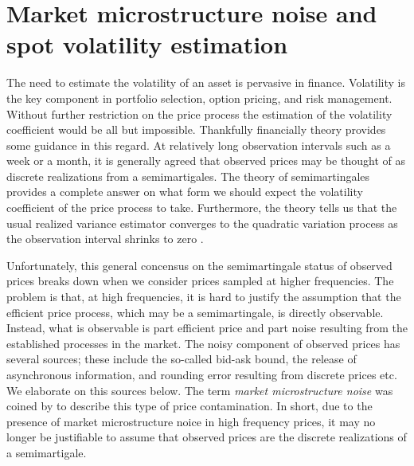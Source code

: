 \chapter{Market microstructure noise and spot volatility estimation }
The need to estimate the volatility of an asset is pervasive in finance. Volatility is the key component in portfolio selection, option pricing, and risk management.   Without further restriction on the price process the estimation of the volatility coefficient would be all but impossible. Thankfully financially theory provides some guidance in this regard. At relatively long observation intervals such as a week or a month, it is generally agreed that observed prices may be thought of as  discrete realizations from a  semimartigales. The theory of semimartingales provides a complete answer on what form we should expect the volatility coefficient of the price process to take.  Furthermore, the theory tells us that the usual realized variance estimator converges to the quadratic variation process  as the observation interval shrinks to zero \cite[Theorem 23]{Protter2004}. 

Unfortunately, this general concensus on the semimartingale status of observed prices breaks down when we consider prices sampled at  higher frequencies. The problem is that, at high frequencies, it is hard to justify the assumption that the efficient price process, which may be a semimartingale, is directly observable. Instead, what is observable is part efficient price and part noise  resulting from the established processes in the market.    The noisy component of observed prices has several sources; these include the so-called bid-ask bound, the release of asynchronous information, and  rounding error resulting from discrete prices etc. We elaborate on this sources below. The term \emph{market microstructure noise} was coined by \cite{Garman1976} to describe this type of price contamination. In short, due to the presence of market microstructure noice in  high frequency prices, it may no longer be justifiable to assume that observed prices are the discrete realizations of a semimartigale.



